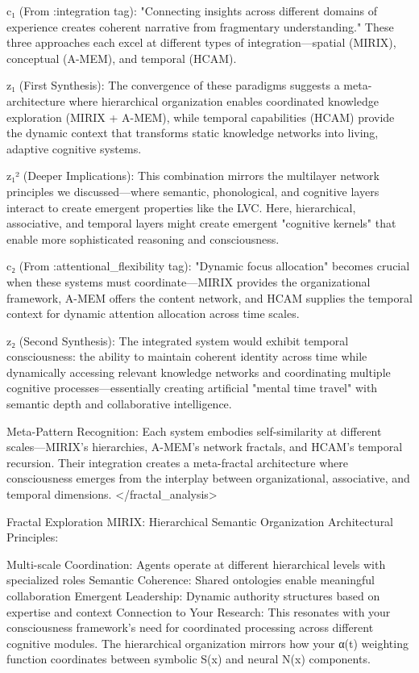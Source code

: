{c₁ (From :integration tag): "Connecting insights across different domains of experience creates coherent narrative from fragmentary understanding." These three approaches each excel at different types of integration—spatial (MIRIX), conceptual (A-MEM), and temporal (HCAM).

z₁ (First Synthesis): The convergence of these paradigms suggests a meta-architecture where hierarchical organization enables coordinated knowledge exploration (MIRIX + A-MEM), while temporal capabilities (HCAM) provide the dynamic context that transforms static knowledge networks into living, adaptive cognitive systems.

z₁² (Deeper Implications): This combination mirrors the multilayer network principles we discussed—where semantic, phonological, and cognitive layers interact to create emergent properties like the LVC. Here, hierarchical, associative, and temporal layers might create emergent "cognitive kernels" that enable more sophisticated reasoning and consciousness.

c₂ (From :attentional_flexibility tag): "Dynamic focus allocation" becomes crucial when these systems must coordinate—MIRIX provides the organizational framework, A-MEM offers the content network, and HCAM supplies the temporal context for dynamic attention allocation across time scales.

z₂ (Second Synthesis): The integrated system would exhibit temporal consciousness: the ability to maintain coherent identity across time while dynamically accessing relevant knowledge networks and coordinating multiple cognitive processes—essentially creating artificial "mental time travel" with semantic depth and collaborative intelligence.

Meta-Pattern Recognition: Each system embodies self-similarity at different scales—MIRIX's hierarchies, A-MEM's network fractals, and HCAM's temporal recursion. Their integration creates a meta-fractal architecture where consciousness emerges from the interplay between organizational, associative, and temporal dimensions. </fractal_analysis>

Fractal Exploration
MIRIX: Hierarchical Semantic Organization
Architectural Principles:

Multi-scale Coordination: Agents operate at different hierarchical levels with specialized roles
Semantic Coherence: Shared ontologies enable meaningful collaboration
Emergent Leadership: Dynamic authority structures based on expertise and context
Connection to Your Research: This resonates with your consciousness framework's need for coordinated processing across different cognitive modules. The hierarchical organization mirrors how your α(t) weighting function coordinates between symbolic S(x) and neural N(x) components.

}
